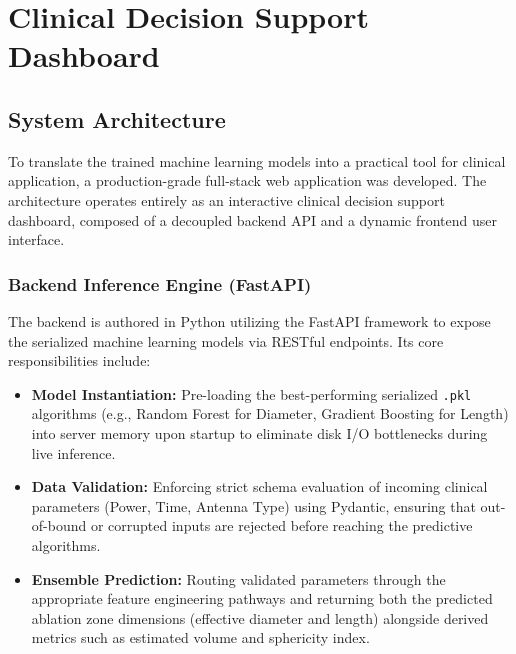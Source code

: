 \chapter{Clinical Decision Support Dashboard}

\section{System Architecture}

To translate the trained machine learning models into a practical tool for clinical application, a production-grade full-stack web application was developed. The architecture operates entirely as an interactive clinical decision support dashboard, composed of a decoupled backend API and a dynamic frontend user interface.

\subsection{Backend Inference Engine (FastAPI)}
The backend is authored in Python utilizing the FastAPI framework to expose the serialized machine learning models via RESTful endpoints. Its core responsibilities include:
\begin{itemize}
    \item \textbf{Model Instantiation:} Pre-loading the best-performing serialized \texttt{.pkl} algorithms (e.g., Random Forest for Diameter, Gradient Boosting for Length) into server memory upon startup to eliminate disk I/O bottlenecks during live inference.
    \item \textbf{Data Validation:} Enforcing strict schema evaluation of incoming clinical parameters (Power, Time, Antenna Type) using Pydantic, ensuring that out-of-bound or corrupted inputs are rejected before reaching the predictive algorithms.
    \item \textbf{Ensemble Prediction:} Routing validated parameters through the appropriate feature engineering pathways and returning both the predicted ablation zone dimensions (effective diameter and length) alongside derived metrics such as estimated volume and sphericity index.
\end{itemize}

